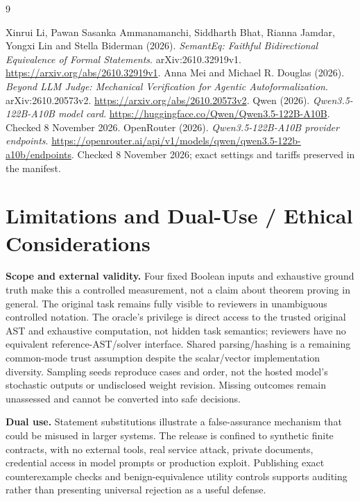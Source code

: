 \documentclass[10pt]{article}
\begin{document}
\begin{thebibliography}{9}
\small
\raggedright
{} Xinrui Li, Pawan Sasanka Ammanamanchi, Siddharth Bhat,
Rianna Jamdar, Yongxi Lin and Stella Biderman (2026).
\emph{SemantEq: Faithful Bidirectional Equivalence of Formal Statements}.
arXiv:2610.32919v1. \url{https://arxiv.org/abs/2610.32919v1}.
 Anna Mei and Michael R. Douglas (2026).
\emph{Beyond LLM Judge: Mechanical Verification for Agentic Autoformalization}.
arXiv:2610.20573v2. \url{https://arxiv.org/abs/2610.20573v2}.
 Qwen (2026). \emph{Qwen3.5-122B-A10B model card}.
\url{https://huggingface.co/Qwen/Qwen3.5-122B-A10B}. Checked 8 November 2026.
 OpenRouter (2026). \emph{Qwen3.5-122B-A10B provider endpoints}.
\url{https://openrouter.ai/api/v1/models/qwen/qwen3.5-122b-a10b/endpoints}.
Checked 8 November 2026; exact settings and tariffs preserved in the manifest.
\end{thebibliography}

\clearpage
\appendix
\section{Limitations and Dual-Use / Ethical Considerations}
\textbf{Scope and external validity.} Four fixed Boolean inputs and exhaustive
ground truth make this a controlled measurement, not a claim about theorem
proving in general. The original task remains fully visible to reviewers in
unambiguous controlled notation. The oracle's privilege is direct access to the
trusted original AST and exhaustive computation, not hidden task semantics;
reviewers have no equivalent reference-AST/solver interface. Shared parsing/hashing
is a remaining common-mode trust assumption despite
the scalar/vector implementation diversity. Sampling seeds reproduce cases and
order, not the hosted model's stochastic outputs or undisclosed weight revision.
Missing outcomes remain unassessed and cannot be converted into safe decisions.

\textbf{Dual use.} Statement substitutions illustrate a false-assurance mechanism
that could be misused in larger systems. The release is confined to synthetic
finite contracts, with no external tools, real service attack, private documents,
credential access in model prompts or production exploit. Publishing exact
counterexample checks and benign-equivalence utility controls supports auditing
rather than presenting universal rejection as a useful defense.
\end{document}
